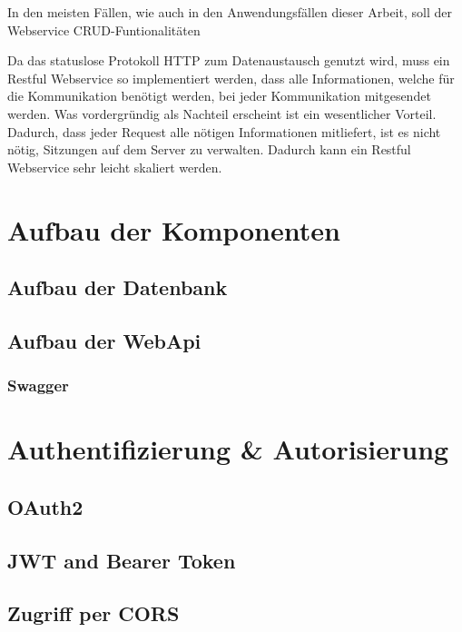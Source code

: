 In den meisten Fällen, wie auch in den Anwendungsfällen dieser Arbeit, soll der Webservice \ac{CRUD}-Funtionalitäten

Da das statuslose Protokoll HTTP zum Datenaustausch genutzt wird, muss ein Restful Webservice so implementiert werden, dass alle Informationen, welche für die Kommunikation benötigt werden, bei jeder Kommunikation mitgesendet werden. Was vordergründig als Nachteil erscheint ist ein wesentlicher Vorteil. Dadurch, dass jeder Request alle nötigen Informationen mitliefert, ist es nicht nötig, Sitzungen auf dem Server zu verwalten. Dadurch kann ein Restful Webservice sehr leicht skaliert werden. 



\section{Aufbau der Komponenten}
\label{sec:aufbau-Komponenten}

\subsection{Aufbau der Datenbank}
\label{ssec:aufbau-server-db}

\subsection{Aufbau der WebApi}
\label{ssec:aufbau-webapi}

\subsubsection*{Swagger}
\label{sssec:Swagger}

\section{Authentifizierung \& Autorisierung}
\label{sec:server-authorisierung}

\subsection{OAuth2}
\label{ssec:oauth2}

\subsection{JWT and Bearer Token}
\label{ssec:jwt-bearer}

\subsection{Zugriff per CORS}
\label{ssec:cors}